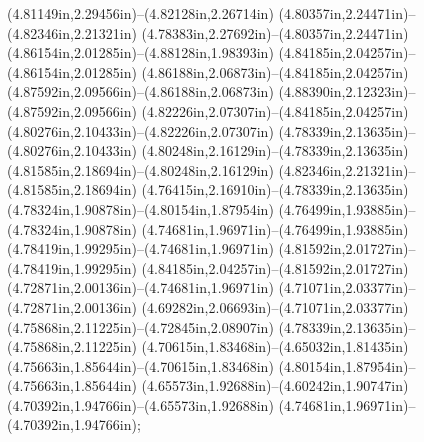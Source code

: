 (4.81149in,2.29456in)--(4.82128in,2.26714in) (4.80357in,2.24471in)--(4.82346in,2.21321in) (4.78383in,2.27692in)--(4.80357in,2.24471in) (4.86154in,2.01285in)--(4.88128in,1.98393in) (4.84185in,2.04257in)--(4.86154in,2.01285in) (4.86188in,2.06873in)--(4.84185in,2.04257in) (4.87592in,2.09566in)--(4.86188in,2.06873in) (4.88390in,2.12323in)--(4.87592in,2.09566in) (4.82226in,2.07307in)--(4.84185in,2.04257in) (4.80276in,2.10433in)--(4.82226in,2.07307in) (4.78339in,2.13635in)--(4.80276in,2.10433in) (4.80248in,2.16129in)--(4.78339in,2.13635in) (4.81585in,2.18694in)--(4.80248in,2.16129in) (4.82346in,2.21321in)--(4.81585in,2.18694in) (4.76415in,2.16910in)--(4.78339in,2.13635in) (4.78324in,1.90878in)--(4.80154in,1.87954in) (4.76499in,1.93885in)--(4.78324in,1.90878in) (4.74681in,1.96971in)--(4.76499in,1.93885in) (4.78419in,1.99295in)--(4.74681in,1.96971in) (4.81592in,2.01727in)--(4.78419in,1.99295in) (4.84185in,2.04257in)--(4.81592in,2.01727in) (4.72871in,2.00136in)--(4.74681in,1.96971in) (4.71071in,2.03377in)--(4.72871in,2.00136in) (4.69282in,2.06693in)--(4.71071in,2.03377in) (4.75868in,2.11225in)--(4.72845in,2.08907in) (4.78339in,2.13635in)--(4.75868in,2.11225in) (4.70615in,1.83468in)--(4.65032in,1.81435in) (4.75663in,1.85644in)--(4.70615in,1.83468in) (4.80154in,1.87954in)--(4.75663in,1.85644in) (4.65573in,1.92688in)--(4.60242in,1.90747in) (4.70392in,1.94766in)--(4.65573in,1.92688in) (4.74681in,1.96971in)--(4.70392in,1.94766in);
